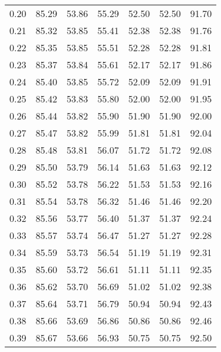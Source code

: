 \begin{tabular}{|c|c|c|c|c|c|c|}
      0.20 &     85.29 &     53.86 &      55.29 &   52.50 &      52.50 &         91.70 \\
      0.21 &     85.32 &     53.85 &      55.41 &   52.38 &      52.38 &         91.76 \\
      0.22 &     85.35 &     53.85 &      55.51 &   52.28 &      52.28 &         91.81 \\
      0.23 &     85.37 &     53.84 &      55.61 &   52.17 &      52.17 &         91.86 \\
      0.24 &     85.40 &     53.85 &      55.72 &   52.09 &      52.09 &         91.91 \\
      0.25 &     85.42 &     53.83 &      55.80 &   52.00 &      52.00 &         91.95 \\
      0.26 &     85.44 &     53.82 &      55.90 &   51.90 &      51.90 &         92.00 \\
      0.27 &     85.47 &     53.82 &      55.99 &   51.81 &      51.81 &         92.04 \\
      0.28 &     85.48 &     53.81 &      56.07 &   51.72 &      51.72 &         92.08 \\
      0.29 &     85.50 &     53.79 &      56.14 &   51.63 &      51.63 &         92.12 \\
      0.30 &     85.52 &     53.78 &      56.22 &   51.53 &      51.53 &         92.16 \\
      0.31 &     85.54 &     53.78 &      56.32 &   51.46 &      51.46 &         92.20 \\
      0.32 &     85.56 &     53.77 &      56.40 &   51.37 &      51.37 &         92.24 \\
      0.33 &     85.57 &     53.74 &      56.47 &   51.27 &      51.27 &         92.28 \\
      0.34 &     85.59 &     53.73 &      56.54 &   51.19 &      51.19 &         92.31 \\
      0.35 &     85.60 &     53.72 &      56.61 &   51.11 &      51.11 &         92.35 \\
      0.36 &     85.62 &     53.70 &      56.69 &   51.02 &      51.02 &         92.38 \\
      0.37 &     85.64 &     53.71 &      56.79 &   50.94 &      50.94 &         92.43 \\
      0.38 &     85.66 &     53.69 &      56.86 &   50.86 &      50.86 &         92.46 \\
      0.39 &     85.67 &     53.66 &      56.93 &   50.75 &      50.75 &         92.50 \\

\end{tabular}
